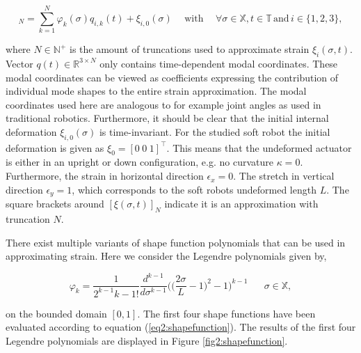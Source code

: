 \begin{equation}
    [\xi_i(\sigma,t)]_N = \sum_{k=1}^N \varphi_k(\sigma)q_{i,k}(t) + \xi_{i,0}(\sigma) \hspace{15pt} \text{with} \hspace{15pt} \forall \sigma \in \mathbb{X}, t \in \mathbb{T}  \hspace{2pt} \text{and} \hspace{2pt} i \in \{1,2,3\},
    \label{eq2:strainapprox}
\end{equation}

where $N \in \mathbb{N}^+$ is the amount of truncations used to approximate strain $\xi_i(\sigma,t)$. Vector $q(t) \in \mathbb{R}^{3 \times N}$ only contains time-dependent modal coordinates. These modal coordinates can be viewed as coefficients expressing the contribution of individual mode shapes to the entire strain approximation. The modal coordinates used here are analogous to for example joint angles as used in traditional robotics. Furthermore, it should be clear that the initial internal deformation $\xi_{i,0}(\sigma)$ is time-invariant. For the studied soft robot the initial deformation is given as $\xi_0 = [0 \hspace{3pt} 0 \hspace{3pt} 1]^\top$. This means that the undeformed actuator is either in an upright or down configuration, e.g. no curvature $\kappa = 0$. Furthermore, the strain in horizontal direction $\epsilon_x = 0$. The stretch in vertical direction $\epsilon_y = 1$, which corresponds to the soft robots undeformed length $L$. The square brackets around $[\xi(\sigma,t)]_N$ indicate it is an approximation with truncation $N$. 

There exist multiple variants of shape function polynomials that can be used in approximating strain. Here we consider the Legendre polynomials given by,

\begin{equation}
    \varphi_{k} = \frac{1}{2^{k-1} k-1!} \frac{d^{k-1}}{d\sigma^{k-1}}\Big(\Big(\frac{2\sigma}{L}-1\Big)^2-1\Big)^{k-1} \hspace{20pt} \sigma \in \mathbb{X},
    \label{eq2:shapefunction}
\end{equation}

on the bounded domain $[0,1]$. The first four shape functions have been evaluated according to equation (\ref{eq2:shapefunction}). The results of the first four Legendre polynomials are displayed in Figure \ref{fig2:shapefunction}. 

